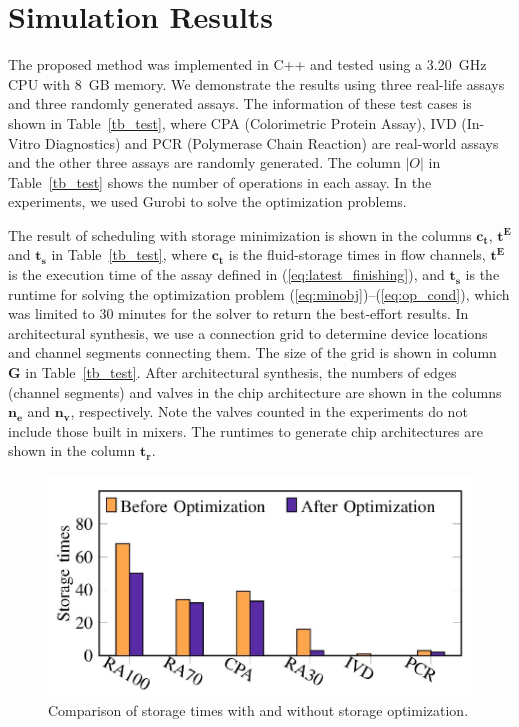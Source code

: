 \section{Simulation Results}\label{sec:results}

The proposed method was implemented in C++ and tested using a \SI[mode=text]{3.20}{\GHz} CPU with
\SI{8}{GB} memory.  We demonstrate the results using three real-life assays and three randomly generated assays. The information of these test cases is shown in Table~\ref{tb_test}, where CPA (Colorimetric Protein Assay), IVD (In-Vitro Diagnostics) and PCR (Polymerase Chain Reaction) are real-world assays and the other three assays are randomly generated. The column $|O|$ in Table~\ref{tb_test} shows the number of operations in each assay. In the experiments, we used Gurobi \cite{gurobi} to solve the optimization problems.

The result of scheduling with storage minimization is shown in the columns $\boldsymbol{c_t}$, $\boldsymbol{t^E}$ and $\boldsymbol{t_s}$ in Table~\ref{tb_test}, where $\boldsymbol{c_t}$ is the fluid-storage times in flow channels, $\boldsymbol{t^E}$ is the execution time of the assay defined in (\ref{eq:latest_finishing}), and $\boldsymbol{t_s}$ is the runtime for solving the optimization problem (\ref{eq:minobj})--(\ref{eq:op_cond}), which was limited to 30 minutes for the solver to return the best-effort results. In architectural synthesis, we use a connection
grid to determine device locations and channel segments connecting them. The size of the grid is shown in
column $\boldsymbol{G}$ in Table~\ref{tb_test}. After architectural synthesis, the numbers of
edges (channel segments) and valves in the chip architecture are shown in the columns $\boldsymbol{n_e}$ and $\boldsymbol{n_v}$, respectively. Note the valves counted in the experiments do not include those built in mixers. The runtimes to generate chip architectures are shown in the column $\boldsymbol{t_r}$.

\begin{figure}[t]
    \centering
    \includegraphics[width=0.85\linewidth]{Visio/storage_cmp.pdf}
  \caption{Comparison of storage times with and without storage optimization.}
      \label{fig:storage_cmp}
\end{figure}

